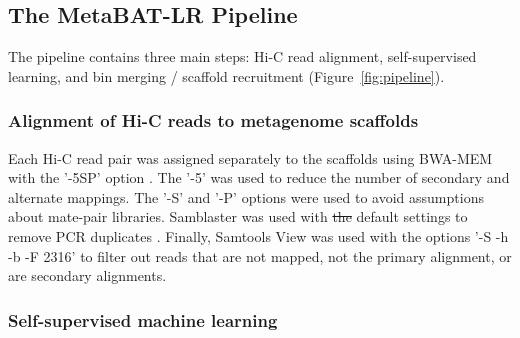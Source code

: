 \documentclass[fleqn,10pt,lineno]{wlpeerj}
\providecommand{\DIFdeltex}[1]{{\protect\color{red}\sout{#1}}}                      %
\providecommand{\DIFdelbegin}{} %
\providecommand{\DIFdelend}{} %
\providecommand{\DIFdel}[1]{\texorpdfstring{\DIFdeltex{#1}}{}} %
\newcommand{\DIFscaledelfig}{0.5}
\newlength{\DIFdelgraphicswidth} %
\newlength{\DIFdelgraphicsheight} %
\newcommand{\DIFdelincludegraphics}[2][]{%
\sbox{\DIFdelgraphicsbox}{\DIFOincludegraphics[#1]{#2}}%
\settoboxwidth{\DIFdelgraphicswidth}{\DIFdelgraphicsbox} %
\settoboxtotalheight{\DIFdelgraphicsheight}{\DIFdelgraphicsbox} %
\scalebox{\DIFscaledelfig}{%
\parbox[b]{\DIFdelgraphicswidth}{\usebox{\DIFdelgraphicsbox}\\[-\baselineskip] \rule{\DIFdelgraphicswidth}{0em}}\llap{\resizebox{\DIFdelgraphicswidth}{\DIFdelgraphicsheight}{%
\setlength{\unitlength}{\DIFdelgraphicswidth}%
\begin{picture}(1,1)%
\thicklines\linethickness{2pt} %
{\color[rgb]{1,0,0}\put(0,0){\framebox(1,1){}}}%
{\color[rgb]{1,0,0}\put(0,0){\line( 1,1){1}}}%
{\color[rgb]{1,0,0}\put(0,1){\line(1,-1){1}}}%
\end{picture}%
}\hspace*{3pt}}} %
} %
\DeclareRobustCommand{\DIFdelbegin}{\DIFOdelbegin \let\includegraphics\DIFdelincludegraphics} %
\DeclareRobustCommand{\DIFdelend}{\DIFOaddend \let\includegraphics\DIFOincludegraphics} %
\begin{document}
\subsection*{The MetaBAT-LR Pipeline}

The pipeline contains three main steps: Hi-C read alignment, self-supervised learning, and bin merging / scaffold recruitment (Figure~\ref{fig:pipeline}).

\subsubsection*{Alignment of Hi-C reads to metagenome scaffolds} 

Each Hi-C read pair was assigned separately to the scaffolds using BWA-MEM with the '-5SP' option \citep{li2013aligning}. The '-5' was used to reduce the number of secondary and alternate mappings. The '-S' and '-P' options were used to avoid assumptions about mate-pair libraries. Samblaster was used with \DIFdelbegin \DIFdel{the }\DIFdelend default settings to remove PCR duplicates \citep{faust2014samblaster}. Finally, Samtools View was used with the options '-S -h -b -F 2316' to filter out reads that are not mapped, not the primary alignment, or are secondary alignments.  

\subsubsection*{Self-supervised machine learning}
\end{document}
